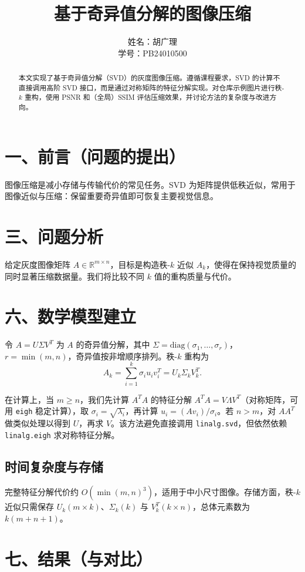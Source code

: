 \documentclass{article}
\title{基于奇异值分解的图像压缩}
\author{姓名：胡广理 \\ 学号：PB24010500}
\begin{document}
\maketitle
\begin{abstract}
    本文实现了基于奇异值分解（SVD）的灰度图像压缩。遵循课程要求，SVD 的计算不直接调用高阶 SVD 接口，而是通过对称矩阵的特征分解实现。对仓库示例图片进行秩-$k$ 重构，使用 PSNR 和（全局）SSIM 评估压缩效果，并讨论方法的复杂度与改进方向。
\end{abstract}


\setcounter{section}{1}
\section*{一、前言（问题的提出）}
图像压缩是减小存储与传输代价的常见任务。SVD 为矩阵提供低秩近似，常用于图像近似与压缩：保留重要奇异值即可恢复主要视觉信息。

\setcounter{section}{3}
\section*{三、问题分析}
给定灰度图像矩阵 $A\in \mathbb{R}^{m\times n}$，目标是构造秩-$k$ 近似 $A_k$，使得在保持视觉质量的同时显著压缩数据量。我们将比较不同 $k$ 值的重构质量与代价。

\setcounter{section}{6}
\section*{六、数学模型建立}
令 $A=U\Sigma V^T$ 为 $A$ 的奇异值分解，其中 $\Sigma=\mathrm{diag}(\sigma_1,\dots,\sigma_r)$，$r=\min(m,n)$，奇异值按非增顺序排列。秩-$k$ 重构为
$$A_k=\sum_{i=1}^k\sigma_i u_i v_i^T = U_k \Sigma_k V_k^T.$$ 

在计算上，当 $m\ge n$，我们先计算 $A^TA$ 的特征分解 $A^TA=V\Lambda V^T$（对称矩阵，可用 \texttt{eigh} 稳定计算），取 $\sigma_i=\sqrt{\lambda_i}$，再计算 $u_i=(A v_i)/\sigma_i$。若 $n>m$，对 $AA^T$ 做类似处理以得到 $U$，再求 $V$。该方法避免直接调用 \texttt{linalg.svd}，但依然依赖 \texttt{linalg.eigh} 求对称特征分解。

\subsection*{时间复杂度与存储}
完整特征分解代价约 $O(\min(m,n)^3)$，适用于中小尺寸图像。存储方面，秩-$k$ 近似只需保存 $U_k( m\times k)$、$\Sigma_k(k)$ 与 $V_k^T(k\times n)$，总体元素数为 $k(m+n+1)$。

\setcounter{section}{7}
\section*{七、结果（与对比）}
\end{document}
